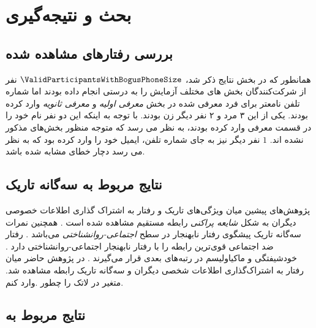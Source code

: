 \chapter{بحث و نتیجه‌گیری}
\section{بررسی رفتارهای مشاهده شده }
همانطور که در بخش نتایج ذکر شد،
$\ValidParticipantsWithBogusPhoneSize$
 نفر  از شرکت‌کنندگان 
بخش های مختلف آزمایش را به درستی انجام داده بودند اما شماره تلفن نامعتر
برای فرد معرفی شده در بخش‌ 
\textit{معرفی اولیه}
و
\textit{معرفی ثانویه}
وارد کرده بودند. یکی از این ۳ مرد و ۲ نفر دیگر زن بودند. با توجه به اینکه این دو نفر نام
خود را در قسمت معرفی وارد کرده بودند، به نظر می رسد که متوجه منظور بخش‌های مذکور نشده اند.
$1$
نفر دیگر نیز به جای شماره تلفن، ایمیل خود را وارد کرده بود که به نظر می رسد دچار خطای مشابه 
شده باشد. 
\section{نتایج مربوط به سه‌گانه تاریک}
پژوهش‌های پیشین میان ویژگی‌های تاریک و رفتار
به اشتراک گذاری اطلاعات خصوصی دیگران به شکل
\textit{
    شایعه پراکنی
}
رابطه مستقیم مشاهده شده است
\!\cite{hartungBetterItsReputation2019}
\!.
همچنین نمرات سه‌گانه تاریک پیشگوی رفتار نابهنجار در سطح
\textit{
    اجتماعی-روانشناختی
}
می‌باشد
\!\cite{murisMalevolentSideHuman2017}
\!.
رفتار ضد اجتماعی قوی‌ترین رابطه را با رفتار نابهنجار اجتماعی-روانشناختی دارد
\!. خودشیفتگی
و ماکیاولیسم
در رتبه‌های بعدی قرار می‌گیرند
\!.
در پژوهش حاضر میان رفتار به اشتراک‌گذاری اطلاعات شخصی دیگران و سه‌گانه تاریک رابطه مشاهده شد.
متغیر در لاتک را چطور .وارد کنم.
\section{
    نتایج مربوط به
}

